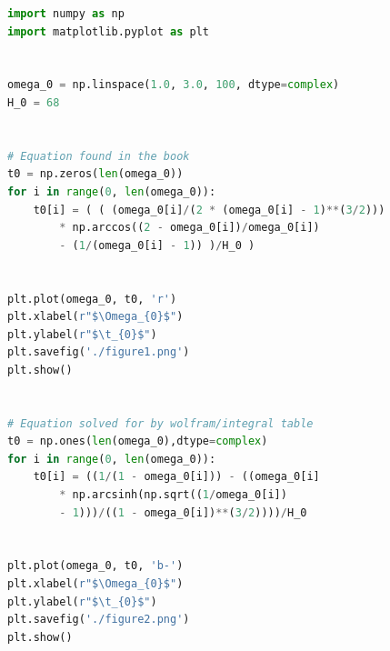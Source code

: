 \documentclass[12pt]{article}
\begin{document}
\begin{lstlisting}[language=Python, caption= Problem 5.3 plotting code]
import numpy as np
import matplotlib.pyplot as plt


omega_0 = np.linspace(1.0, 3.0, 100, dtype=complex)
H_0 = 68


# Equation found in the book
t0 = np.zeros(len(omega_0))
for i in range(0, len(omega_0)):
    t0[i] = ( ( (omega_0[i]/(2 * (omega_0[i] - 1)**(3/2))) 
        * np.arccos((2 - omega_0[i])/omega_0[i]) 
        - (1/(omega_0[i] - 1)) )/H_0 )


plt.plot(omega_0, t0, 'r')
plt.xlabel(r"$\Omega_{0}$")
plt.ylabel(r"$\t_{0}$")
plt.savefig('./figure1.png')
plt.show()


# Equation solved for by wolfram/integral table
t0 = np.ones(len(omega_0),dtype=complex)
for i in range(0, len(omega_0)):
    t0[i] = ((1/(1 - omega_0[i])) - ((omega_0[i] 
        * np.arcsinh(np.sqrt((1/omega_0[i]) 
        - 1)))/((1 - omega_0[i])**(3/2))))/H_0


plt.plot(omega_0, t0, 'b-')
plt.xlabel(r"$\Omega_{0}$")
plt.ylabel(r"$\t_{0}$")
plt.savefig('./figure2.png')
plt.show() 
\end{lstlisting}



 
\end{document}
